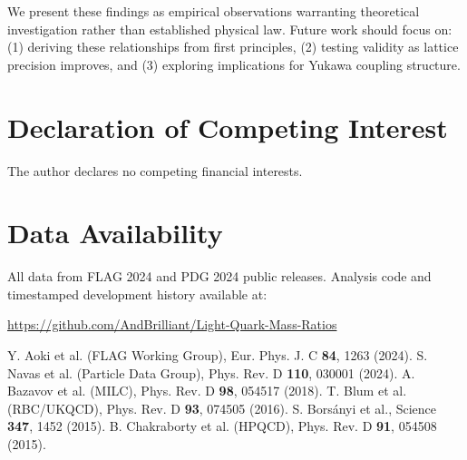 \documentclass[12pt]{article}
\begin{document}
We present these findings as empirical observations warranting theoretical investigation rather than established physical law. Future work should focus on: (1) deriving these relationships from first principles, (2) testing validity as lattice precision improves, and (3) exploring implications for Yukawa coupling structure.

\section*{Declaration of Competing Interest}
The author declares no competing financial interests.

\section*{Data Availability}
All data from FLAG 2024 and PDG 2024 public releases. Analysis code and timestamped development history available at:

\url{https://github.com/AndBrilliant/Light-Quark-Mass-Ratios}

\begin{thebibliography}{99}

 Y. Aoki et al. (FLAG Working Group), Eur. Phys. J. C \textbf{84}, 1263 (2024).
 S. Navas et al. (Particle Data Group), Phys. Rev. D \textbf{110}, 030001 (2024).
 A. Bazavov et al. (MILC), Phys. Rev. D \textbf{98}, 054517 (2018).
 T. Blum et al. (RBC/UKQCD), Phys. Rev. D \textbf{93}, 074505 (2016).
 S. Borsányi et al., Science \textbf{347}, 1452 (2015).
 B. Chakraborty et al. (HPQCD), Phys. Rev. D \textbf{91}, 054508 (2015).

\end{thebibliography}
\end{document}
